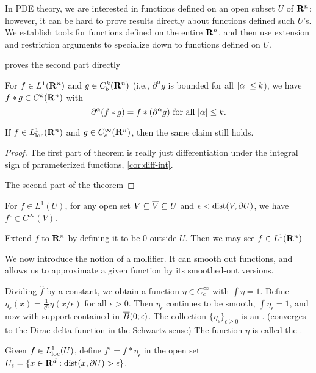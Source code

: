 In PDE theory, we are interested in functions defined on an open subset $U$ of $\mathbf{R}^n$; however, it can be hard to prove results directly about functions defined such $U$'s. We establish tools for functions defined on the entire $\mathbf{R}^n$, and then use extension and restriction arguments to specialize down to functions defined on $U$.

\cite[Proposition~4.20]{Brezis_2011} proves the second part directly

\begin{prop}
    For $f \in L^1(\mathbf{R}^n)$ and $g\in C^k_b(\mathbf{R}^n)$ (i.e., $\partial^\alpha g$ is bounded for all $\lvert \alpha \rvert \leq k$), we have $f * g \in C^k(\mathbf{R}^n)$ with \[
        \partial^\alpha (f * g) = f * (\partial^\alpha g) \text{ for all } \lvert \alpha \rvert \leq k.
    \] 

    If $f \in L^1_\mathrm{loc}(\mathbf{R}^n)$ and $g \in C_c^\infty(\mathbf{R}^n)$, then the same claim still holds.
\end{prop}
\begin{proof}
    The first part of theorem is really just differentiation under the integral sign of parameterized functions, \cref{cor:diff-int}.

    The second part of the theorem 
\end{proof}



\cite[Lemma~19.22]{Jost_2005}
For $f \in L^1(U)$, for any open set $V \subseteq \overline{V} \subseteq U$ and $\epsilon < \operatorname{dist}(V,\partial U)$, we have $f^\epsilon \in C^\infty (V)$.

Extend $f$ to $\mathbf{R}^n$ by defining it to be $0$ outside $U$. Then we may see $f \in L^1(\mathbf{R}^n)$

We now introduce the notion of a mollifier. It can smooth out functions, and allows us to approximate a given function by its smoothed-out versions.

Dividing $\hat f$ by a constant, we obtain a function $\eta \in C_c^\infty$ with $\int \eta = 1$. Define $\eta_\epsilon(x) = \frac{1}{\epsilon^n} \eta(x/\epsilon )$ for all $\epsilon > 0$. Then $\eta_\epsilon$ continues to be smooth, $\int \eta_\epsilon = 1$, and now with support contained in $\overline{B}(0;\epsilon)$. The collection $\{\eta_\epsilon\}_{\epsilon \geq 0}$ is an . (converges to the Dirac delta function in the Schwartz sense) The function $\eta$ is called the .

Given $f\in L^1_\mathrm{loc}(U)$, define $f^\epsilon = f * \eta_\epsilon$ in the open set $U_\epsilon = \{x \in \mathbf{R}^d : \operatorname{dist}(x,\partial U) > \epsilon\}$.

